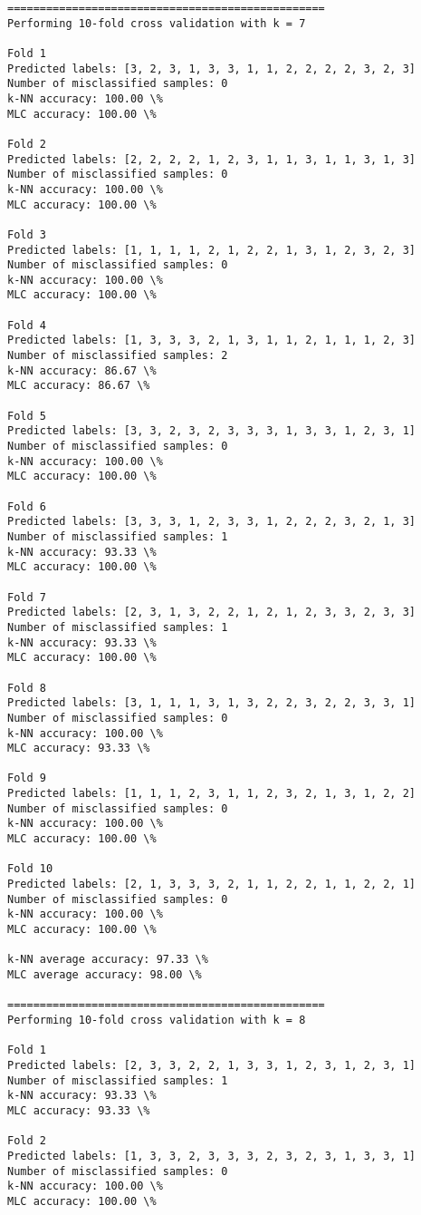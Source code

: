 \documentclass[11pt]{article}
\begin{document}
\begin{Verbatim}[commandchars=\\\{\}]
=================================================
Performing 10-fold cross validation with k = 7

Fold 1
Predicted labels: [3, 2, 3, 1, 3, 3, 1, 1, 2, 2, 2, 2, 3, 2, 3]
Number of misclassified samples: 0
k-NN accuracy: 100.00 \%
MLC accuracy: 100.00 \%

Fold 2
Predicted labels: [2, 2, 2, 2, 1, 2, 3, 1, 1, 3, 1, 1, 3, 1, 3]
Number of misclassified samples: 0
k-NN accuracy: 100.00 \%
MLC accuracy: 100.00 \%

Fold 3
Predicted labels: [1, 1, 1, 1, 2, 1, 2, 2, 1, 3, 1, 2, 3, 2, 3]
Number of misclassified samples: 0
k-NN accuracy: 100.00 \%
MLC accuracy: 100.00 \%

Fold 4
Predicted labels: [1, 3, 3, 3, 2, 1, 3, 1, 1, 2, 1, 1, 1, 2, 3]
Number of misclassified samples: 2
k-NN accuracy: 86.67 \%
MLC accuracy: 86.67 \%

Fold 5
Predicted labels: [3, 3, 2, 3, 2, 3, 3, 3, 1, 3, 3, 1, 2, 3, 1]
Number of misclassified samples: 0
k-NN accuracy: 100.00 \%
MLC accuracy: 100.00 \%

Fold 6
Predicted labels: [3, 3, 3, 1, 2, 3, 3, 1, 2, 2, 2, 3, 2, 1, 3]
Number of misclassified samples: 1
k-NN accuracy: 93.33 \%
MLC accuracy: 100.00 \%

Fold 7
Predicted labels: [2, 3, 1, 3, 2, 2, 1, 2, 1, 2, 3, 3, 2, 3, 3]
Number of misclassified samples: 1
k-NN accuracy: 93.33 \%
MLC accuracy: 100.00 \%

Fold 8
Predicted labels: [3, 1, 1, 1, 3, 1, 3, 2, 2, 3, 2, 2, 3, 3, 1]
Number of misclassified samples: 0
k-NN accuracy: 100.00 \%
MLC accuracy: 93.33 \%

Fold 9
Predicted labels: [1, 1, 1, 2, 3, 1, 1, 2, 3, 2, 1, 3, 1, 2, 2]
Number of misclassified samples: 0
k-NN accuracy: 100.00 \%
MLC accuracy: 100.00 \%

Fold 10
Predicted labels: [2, 1, 3, 3, 3, 2, 1, 1, 2, 2, 1, 1, 2, 2, 1]
Number of misclassified samples: 0
k-NN accuracy: 100.00 \%
MLC accuracy: 100.00 \%

k-NN average accuracy: 97.33 \%
MLC average accuracy: 98.00 \%

=================================================
Performing 10-fold cross validation with k = 8

Fold 1
Predicted labels: [2, 3, 3, 2, 2, 1, 3, 3, 1, 2, 3, 1, 2, 3, 1]
Number of misclassified samples: 1
k-NN accuracy: 93.33 \%
MLC accuracy: 93.33 \%

Fold 2
Predicted labels: [1, 3, 3, 2, 3, 3, 3, 2, 3, 2, 3, 1, 3, 3, 1]
Number of misclassified samples: 0
k-NN accuracy: 100.00 \%
MLC accuracy: 100.00 \%


\end{Verbatim}
\end{document}
